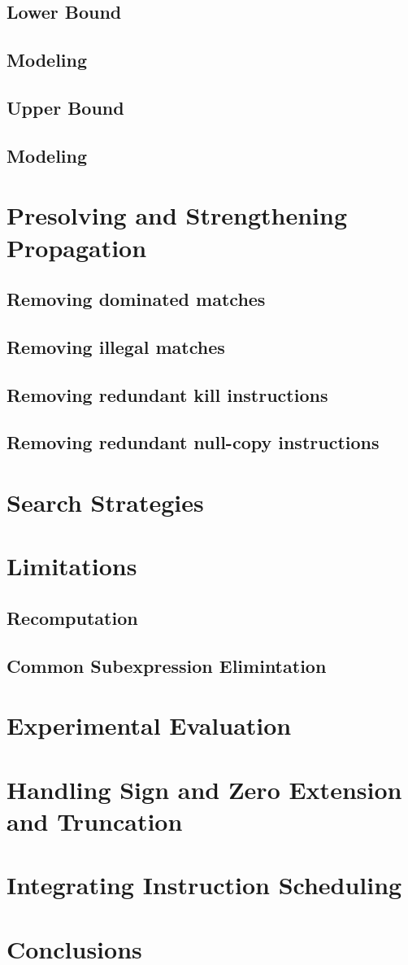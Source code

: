 \documentclass{book}
\begin{document}
\section{Lower Bound}
\section{Modeling}
\section{Upper Bound}
\section{Modeling}

\chapter{Presolving and Strengthening Propagation}
\section{Removing dominated matches}
\section{Removing illegal matches}
\section{Removing redundant kill instructions}
\section{Removing redundant null-copy instructions}

\chapter{Search Strategies}

\chapter{Limitations}
\section{Recomputation}
\section{Common Subexpression Elimintation}

\chapter{Experimental Evaluation}

\chapter{Handling Sign and Zero Extension and Truncation}

\chapter{Integrating Instruction Scheduling}

\chapter{Conclusions}
\end{document}
